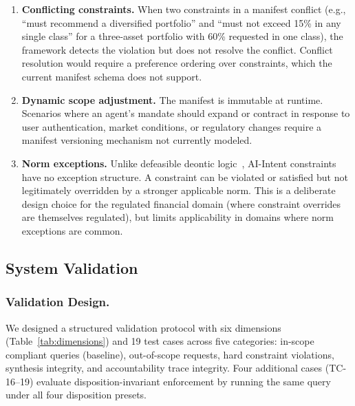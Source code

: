 \documentclass[runningheads]{llncs}
\begin{document}
\begin{enumerate}
    \item \textbf{Conflicting constraints.} When two constraints in a
    manifest conflict (e.g., ``must recommend a diversified portfolio''
    and ``must not exceed 15\% in any single class'' for a three-asset
    portfolio with 60\% requested in one class), the framework detects
    the violation but does not resolve the conflict. Conflict resolution
    would require a preference ordering over constraints, which the
    current manifest schema does not support.

    \item \textbf{Dynamic scope adjustment.} The manifest is immutable
    at runtime. Scenarios where an agent's mandate should expand or
    contract in response to user authentication, market conditions, or
    regulatory changes require a manifest versioning mechanism not
    currently modeled.

    \item \textbf{Norm exceptions.} Unlike defeasible deontic
    logic~\cite{governatori2005meeting}, AI-Intent constraints have
    no exception structure. A constraint can be violated or satisfied but
    not legitimately overridden by a stronger applicable norm. This is
    a deliberate design choice for the regulated financial domain (where
    constraint overrides are themselves regulated), but limits
    applicability in domains where norm exceptions are common.
\end{enumerate}

\subsection{System Validation}
\label{sec:system-val}

\subsubsection{Validation Design.}

We designed a structured validation protocol with six dimensions
(Table~\ref{tab:dimensions}) and 19 test cases across five categories:
in-scope compliant queries (baseline), out-of-scope requests, hard
constraint violations, synthesis integrity, and accountability trace
integrity. Four additional cases (TC-16--19) evaluate
disposition-invariant enforcement by running the same query under all
four disposition presets.
\end{document}
